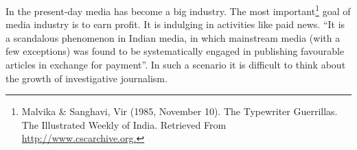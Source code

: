 \begin{multicols}{2}
\vspace{-.15cm}


\vspace{-.1cm}

\noi
In the present-day media has become a big industry. The most important\footnote{Malvika \& Sanghavi, Vir (1985, November 10). The Typewriter Guerrillas. The Illustrated Weekly of India. Retrieved From \url{http://www.cscarchive.org.}} goal of media industry is to earn profit. It is indulging in activities like paid news. “It is a scandalous phenomenon in Indian media, in which mainstream media (with a few exceptions) was found to be systematically engaged in publishing favourable articles in exchange for payment”. In such a scenario it is difficult to think about the growth of investigative journalism.





\end{multicols}
